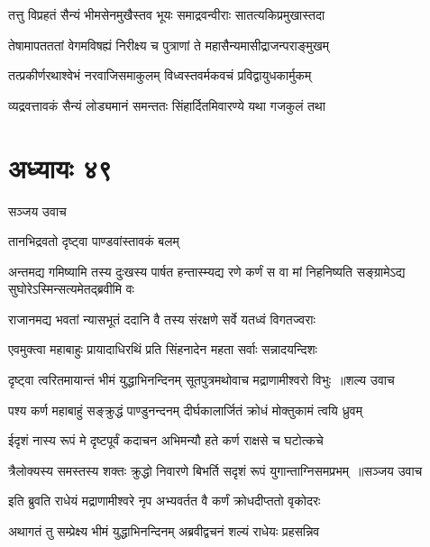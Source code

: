 \twolineshloka
{तत्तु विप्रहतं सैन्यं भीमसेनमुखैस्तव}
{भूयः समाद्रवन्वीराः सातत्यकिप्रमुखास्तदा}


\twolineshloka
{तेषामापतततां वेगमविषह्यं निरीक्ष्य च}
{पुत्राणां ते महासैन्यमासीद्राजन्पराङ्मुखम्}


\twolineshloka
{तत्प्रकीर्णरथाश्वेभं नरवाजिसमाकुलम्}
{विध्वस्तवर्मकवचं प्रविद्वायुधकार्मुकम्}


\twolineshloka
{व्यद्रवत्तावकं सैन्यं लोड्यमानं समन्ततः}
{सिंहार्दितमिवारण्ये यथा गजकुलं तथा}


\chapter{अध्यायः ४९}
\twolineshloka
{सञ्जय उवाच}
{}


\twolineshloka
{तानभिद्रवतो दृष्ट्वा पाण्डवांस्तावकं बलम्}
{}










अन्तमद्य गमिष्यामि तस्य दुःखस्य पार्षत
\twolineshloka
{हन्तास्म्यद्य रणे कर्णं स वा मां निहनिष्यति}
{सङ्ग्रामेऽद्य सुघोरेऽस्मिन्सत्यमेतद्ब्रवीमि वः}


\twolineshloka
{राजानमद्य भवतां न्यासभूतं ददानि वै}
{तस्य संरक्षणे सर्वे यतध्वं विगतज्वराः}


\twolineshloka
{एवमुक्त्वा महाबाहुः प्रायादाधिरथिं प्रति}
{सिंहनादेन महता सर्वाः सन्नादयन्दिशः}


\threelineshloka
{दृष्ट्वा त्वरितमायान्तं भीमं युद्धाभिनन्दिनम्}
{सूतपुत्रमथोवाच मद्राणामीश्वरो विभुः ॥शल्य उवाच}
{}


\twolineshloka
{पश्य कर्ण महाबाहुं सङ्क्रुद्धं पाण्डुनन्दनम्}
{दीर्घकालार्जितं क्रोधं मोक्तुकामं त्वयि ध्रुवम्}


\twolineshloka
{ईदृशं नास्य रूपं मे दृष्टपूर्वं कदाचन}
{अभिमन्यौ हते कर्ण राक्षसे च घटोत्कचे}


\threelineshloka
{त्रैलोक्यस्य समस्तस्य शक्तः क्रुद्धो निवारणे}
{बिभर्ति सदृशं रूपं युगान्ताग्निसमप्रभम् ॥सञ्जय उवाच}
{}


\twolineshloka
{इति ब्रुवति राधेयं मद्राणामीश्वरे नृप}
{अभ्यवर्तत वै कर्णं क्रोधदीप्ततो वृकोदरः}


\twolineshloka
{अथागतं तु सम्प्रेक्ष्य भीमं युद्धाभिनन्दिनम्}
{अब्रवीद्वचनं शल्यं राधेयः प्रहसन्निव}


